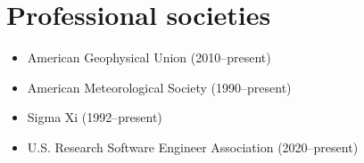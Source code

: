 \section{Professional societies}
\vspace{0.5em}

\begin{itemize}
  \item American Geophysical Union (2010--present)
  \item American Meteorological Society (1990--present)
  \item Sigma Xi (1992--present)
  \item U.S. Research Software Engineer Association (2020--present)
\end{itemize}
